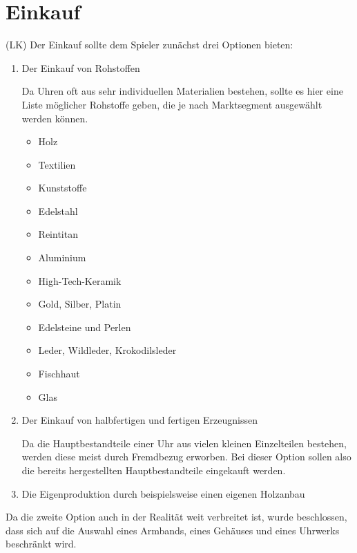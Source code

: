\section{Einkauf}\label{sec:einkauf}
(LK) Der Einkauf sollte dem Spieler zunächst drei Optionen bieten:
\begin{enumerate}
\item Der Einkauf von Rohstoffen \par
Da Uhren oft aus sehr individuellen Materialien bestehen, sollte es hier eine Liste möglicher Rohstoffe geben, die je nach Marktsegment ausgewählt werden können.
\begin{itemize}
\item	Holz	\\
\item	Textilien	\\
\item	Kunststoffe	\\
\item	Edelstahl \\
\item	Reintitan \\
\item	Aluminium \\
\item	High-Tech-Keramik \\
\item	Gold, Silber, Platin
\item Edelsteine und Perlen \\
\item Leder, Wildleder, Krokodilsleder \\
\item	Fischhaut
\item	Glas \\
\end{itemize}
\item Der Einkauf von halbfertigen und fertigen Erzeugnissen \par
Da die Hauptbestandteile einer Uhr aus vielen kleinen Einzelteilen bestehen, werden diese meist durch Fremdbezug erworben. Bei dieser Option sollen also die bereits hergestellten Hauptbestandteile eingekauft werden.
\item Die Eigenproduktion durch beispielsweise einen eigenen Holzanbau
\end{enumerate}

Da die zweite Option auch in der Realität weit verbreitet ist, wurde beschlossen, dass sich auf die Auswahl eines Armbands, eines Gehäuses und eines Uhrwerks beschränkt wird.

